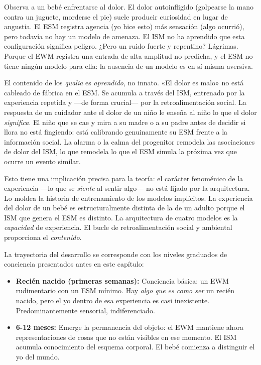 \documentclass[11pt, twoside, openright]{book}
\begin{document}
Observa a un bebé enfrentarse al dolor. El dolor autoinfligido (golpearse la mano contra un juguete, morderse el pie) suele producir curiosidad en lugar de angustia. El ESM registra agencia (yo hice esto) más sensación (algo ocurrió), pero todavía no hay un modelo de amenaza. El ISM no ha aprendido que esta configuración significa peligro. ¿Pero un ruido fuerte y repentino? Lágrimas. Porque el EWM registra una entrada de alta amplitud no predicha, y el ESM no tiene ningún modelo para ella: la ausencia de un modelo es en sí misma aversiva.

El contenido de los \textit{qualia} es \textit{aprendido}, no innato. «El dolor es malo» no está cableado de fábrica en el ESM. Se acumula a través del ISM, entrenado por la experiencia repetida y ---de forma crucial--- por la retroalimentación social. La respuesta de un cuidador ante el dolor de un niño le enseña al niño lo que el dolor \textit{significa}. El niño que se cae y mira a su madre o a su padre antes de decidir si llora no está fingiendo: está calibrando genuinamente su ESM frente a la información social. La alarma o la calma del progenitor remodela las asociaciones de dolor del ISM, lo que remodela lo que el ESM simula la próxima vez que ocurre un evento similar.

Esto tiene una implicación precisa para la teoría: el carácter fenoménico de la experiencia ---lo que se \textit{siente} al sentir algo--- no está fijado por la arquitectura. Lo moldea la historia de entrenamiento de los modelos implícitos. La experiencia del dolor de un bebé es estructuralmente distinta de la de un adulto porque el ISM que genera el ESM es distinto. La arquitectura de cuatro modelos es la \textit{capacidad} de experiencia. El bucle de retroalimentación social y ambiental proporciona el \textit{contenido}.

La trayectoria del desarrollo se corresponde con los niveles graduados de conciencia presentados antes en este capítulo:

\begin{itemize}
  \item \textbf{Recién nacido (primeras semanas):} Conciencia básica: un EWM rudimentario con un ESM mínimo. Hay \textit{algo que es como ser} un recién nacido, pero el yo dentro de esa experiencia es casi inexistente. Predominantemente sensorial, indiferenciado.
\end{itemize}

\begin{itemize}
  \item \textbf{6-12 meses:} Emerge la permanencia del objeto: el EWM mantiene ahora representaciones de cosas que no están visibles en ese momento. El ISM acumula conocimiento del esquema corporal. El bebé comienza a distinguir el yo del mundo.
\end{itemize}
\end{document}
